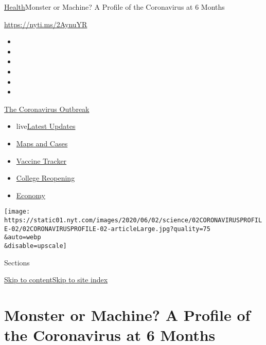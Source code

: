 \href{/section/health}{Health}\textbar{}Monster or Machine? A Profile of
the Coronavirus at 6 Months

\url{https://nyti.ms/2AynuYR}

\begin{itemize}
\item
\item
\item
\item
\item
\item
\end{itemize}

\href{https://www.nytimes.com/news-event/coronavirus?action=click\&pgtype=Article\&state=default\&region=TOP_BANNER\&context=storylines_menu}{The
Coronavirus Outbreak}

\begin{itemize}
\tightlist
\item
  live\href{https://www.nytimes.com/2020/08/03/world/coronavirus-covid-19.html?action=click\&pgtype=Article\&state=default\&region=TOP_BANNER\&context=storylines_menu}{Latest
  Updates}
\item
  \href{https://www.nytimes.com/interactive/2020/us/coronavirus-us-cases.html?action=click\&pgtype=Article\&state=default\&region=TOP_BANNER\&context=storylines_menu}{Maps
  and Cases}
\item
  \href{https://www.nytimes.com/interactive/2020/science/coronavirus-vaccine-tracker.html?action=click\&pgtype=Article\&state=default\&region=TOP_BANNER\&context=storylines_menu}{Vaccine
  Tracker}
\item
  \href{https://www.nytimes.com/2020/08/02/us/covid-college-reopening.html?action=click\&pgtype=Article\&state=default\&region=TOP_BANNER\&context=storylines_menu}{College
  Reopening}
\item
  \href{https://www.nytimes.com/live/2020/08/03/business/stock-market-today-coronavirus?action=click\&pgtype=Article\&state=default\&region=TOP_BANNER\&context=storylines_menu}{Economy}
\end{itemize}

\texttt{[image: https://static01.nyt.com/images/2020/06/02/science/02CORONAVIRUSPROFILE-02/02CORONAVIRUSPROFILE-02-articleLarge.jpg?quality=75\\\&auto=webp\\\&disable=upscale]}

Sections

\protect\hyperlink{site-content}{Skip to
content}\protect\hyperlink{site-index}{Skip to site index}

\hypertarget{monster-or-machine-a-profile-of-the-coronavirus-at-6-months}{%
\section{Monster or Machine? A Profile of the Coronavirus at 6
Months}\label{monster-or-machine-a-profile-of-the-coronavirus-at-6-months}}

